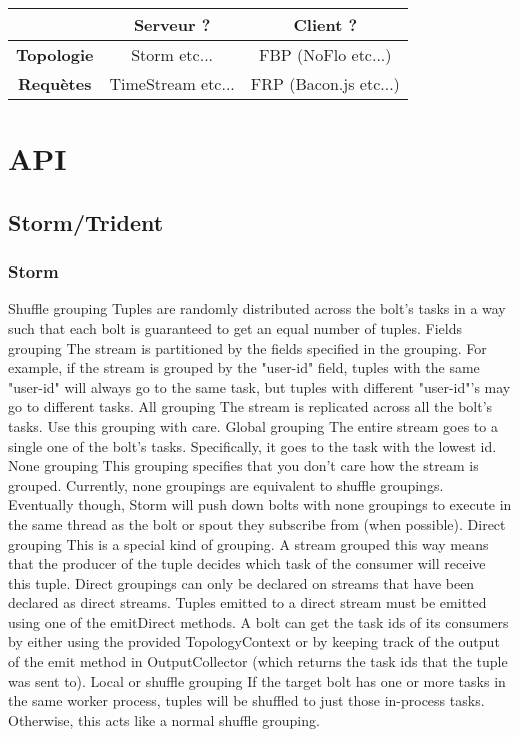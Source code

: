 \begin{longtable}{c | c | c}
                    & \textbf{Serveur} ?     & \textbf{Client} ? \\
\hline
\textbf{Topologie}   & Storm etc...           & FBP (NoFlo etc...) \\
\hline
\textbf{Requètes}   & TimeStream etc...     & FRP (Bacon.js etc...) \\
\end{longtable}


\section{API}

  \subsection{Storm/Trident}

    \subsubsection{Storm}

      Shuffle grouping
        Tuples are randomly distributed across the bolt's tasks in a way such that each bolt is guaranteed to get an equal number of tuples.
      Fields grouping
        The stream is partitioned by the fields specified in the grouping. For example, if the stream is grouped by the "user-id" field, tuples with the same "user-id" will always go to the same task, but tuples with different "user-id"'s may go to different tasks.
      All grouping
        The stream is replicated across all the bolt's tasks. Use this grouping with care.
      Global grouping
        The entire stream goes to a single one of the bolt's tasks. Specifically, it goes to the task with the lowest id.
      None grouping
        This grouping specifies that you don't care how the stream is grouped. Currently, none groupings are equivalent to shuffle groupings. Eventually though, Storm will push down bolts with none groupings to execute in the same thread as the bolt or spout they subscribe from (when possible).
      Direct grouping
        This is a special kind of grouping. A stream grouped this way means that the producer of the tuple decides which task of the consumer will receive this tuple. Direct groupings can only be declared on streams that have been declared as direct streams. Tuples emitted to a direct stream must be emitted using one of the emitDirect methods. A bolt can get the task ids of its consumers by either using the provided TopologyContext or by keeping track of the output of the emit method in OutputCollector (which returns the task ids that the tuple was sent to).
      Local or shuffle grouping
        If the target bolt has one or more tasks in the same worker process, tuples will be shuffled to just those in-process tasks. Otherwise, this acts like a normal shuffle grouping.


